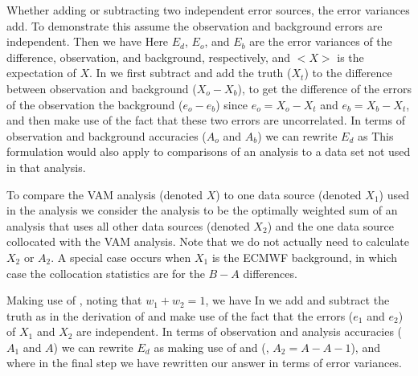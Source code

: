 \documentclass[12pt,titlepage]{article}
\begin{document}

Whether adding or subtracting two independent error sources, the error
variances add.
To demonstrate this assume the observation and background errors are
independent.
Then we have
Here $E_d$, $E_o$, and $E_b$ are the error variances of the
difference, observation, and background, respectively, and $<X>$ is
the expectation of $X$.
In  we first subtract and add the truth ($X_t$) to the
difference between observation and background ($X_o - X_b$), to get
the difference of the errors of the observation the background ($e_o -
e_b$) since $e_o = X_o - X_t$ and $e_b = X_b - X_t$, and then make use
of the fact that these two errors are uncorrelated.
In terms of observation and background accuracies ($A_o$ and $A_b$) we
can rewrite $E_d$ as 
This formulation would also apply to comparisons of an analysis to a
data set not used in that analysis.


To compare the VAM analysis (denoted $X$) to one data source
(denoted $X_1$) used in the analysis we consider the analysis to be
the optimally weighted sum of an analysis that uses all other data
sources (denoted $X_2$) and the one data source collocated with the
VAM analysis.
Note that we do not actually need to calculate $X_2$ or $A_2$.
A special case occurs when $X_1$ is the ECMWF background, in which case the
collocation statistics are for the $B-A$ differences.

Making use of , noting that $w_1 + w_2 = 1$, we have
In  we add and subtract the truth as in the derivation of  and make
use of the fact that the errors ($e_1$ and $e_2$) of $X_1$ and $X_2$
are independent.
In terms of observation and analysis accuracies ($A_1$ and $A$) we
can rewrite $E_d$ as 
making use of  and  (\ie, $A_2=A-A-1$), and
where in the final step we have rewritten our answer in terms of error variances. 	
\end{document}
